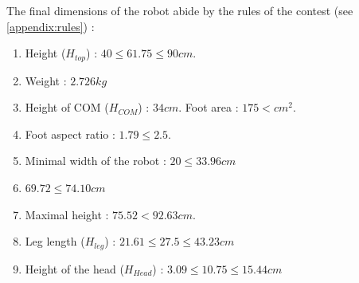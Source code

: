 The final dimensions of the robot abide by the rules of the contest (see \cref{appendix:rules}) :
\begin{enumerate}
\item Height ($H_{top}$) :  $40 \leq 61.75 \leq 90cm$.
\item Weight : $2.726kg$
\item Height of COM ($H_{COM}$) : $34cm$. Foot area : $175 < cm^2$.
\item Foot aspect ratio : $1.79 \leq 2.5$.
\item Minimal width of the robot : $20 \leq 33.96cm$
\item $69.72 \leq 74.10cm$
\item Maximal height : $75.52 < 92.63cm$.
\item Leg length ($H_{leg}$) : $21.61 \leq 27.5 \leq 43.23cm$
\item Height of the head ($H_{Head}$) : $3.09 \leq 10.75 \leq 15.44cm$
\end{enumerate}